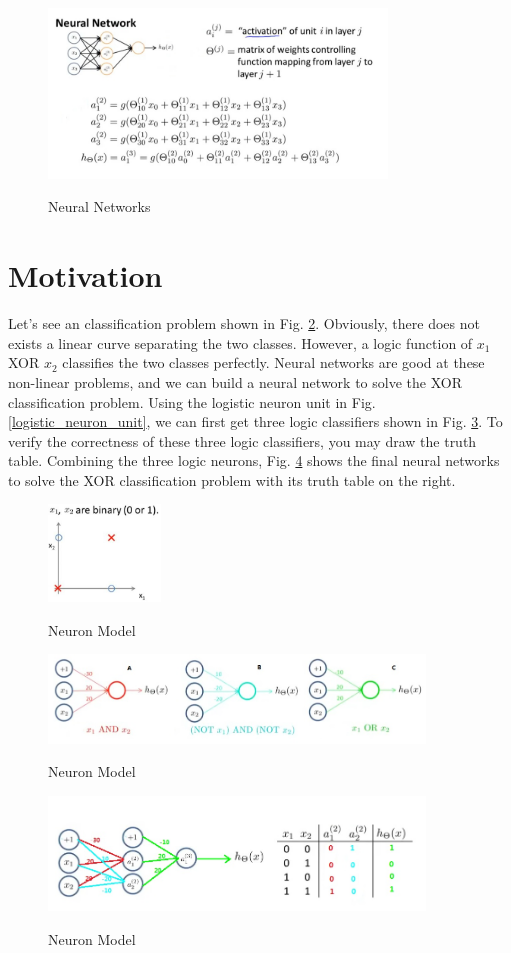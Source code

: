 \documentclass{article}
\begin{document}
\begin{figure}[ht]
  \centering
  \includegraphics[width=9cm]{Figure3.jpg}\\
  \caption{Neural Networks}\label{neural_networks}
\end{figure}
\section{Motivation}
Let's see an classification problem shown in Fig. \ref{XOR_classification_problem}. Obviously, there does not exists a linear curve separating the two classes. However, a logic function of $x_{1}$ XOR $x_{2}$ classifies the two classes perfectly. Neural networks are good at these non-linear problems, and we can build a neural network to solve the XOR classification problem. Using the logistic neuron unit in Fig. \ref{logistic_neuron_unit}, we can first get three logic classifiers shown in Fig. \ref{logic_neurons}. To verify the correctness of these three logic classifiers, you may draw the truth table. Combining the three logic neurons, Fig. \ref{XOR_neural_networks} shows the final neural networks to solve the XOR classification problem with its truth table on the right.
\begin{figure}[hb]
  \centering
  \includegraphics[width=3cm]{Figure4.jpg}\\
  \caption{Neuron Model}\label{XOR_classification_problem}
\end{figure}
\begin{figure}[hb]
  \centering
  \includegraphics[width=10cm]{Figure5.jpg}\\
  \caption{Neuron Model}\label{logic_neurons}
\end{figure}
\begin{figure}[hb]
  \centering
  \includegraphics[width=10cm]{Figure6.jpg}\\
  \caption{Neuron Model}\label{XOR_neural_networks}
\end{figure}
\end{document}
